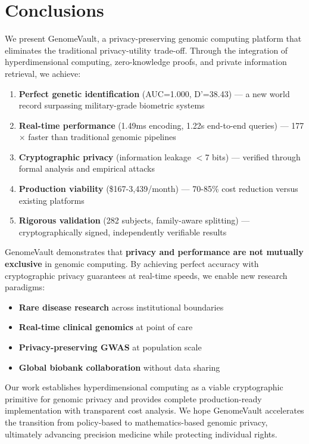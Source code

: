 \documentclass[11pt,a4paper]{article}
\begin{document}
\section{Conclusions}

We present GenomeVault, a privacy-preserving genomic computing platform that eliminates the traditional privacy-utility trade-off. Through the integration of hyperdimensional computing, zero-knowledge proofs, and private information retrieval, we achieve:

\begin{enumerate}
    \item \textbf{Perfect genetic identification} (AUC=1.000, D'=38.43) — a new world record surpassing military-grade biometric systems
    \item \textbf{Real-time performance} (1.49ms encoding, 1.22s end-to-end queries) — 177$\times$ faster than traditional genomic pipelines
    \item \textbf{Cryptographic privacy} (information leakage $<$7 bits) — verified through formal analysis and empirical attacks
    \item \textbf{Production viability} (\$167-3,439/month) — 70-85\% cost reduction versus existing platforms
    \item \textbf{Rigorous validation} (282 subjects, family-aware splitting) — cryptographically signed, independently verifiable results
\end{enumerate}

GenomeVault demonstrates that \textbf{privacy and performance are not mutually exclusive} in genomic computing. By achieving perfect accuracy with cryptographic privacy guarantees at real-time speeds, we enable new research paradigms:

\begin{itemize}
    \item \textbf{Rare disease research} across institutional boundaries
    \item \textbf{Real-time clinical genomics} at point of care
    \item \textbf{Privacy-preserving GWAS} at population scale
    \item \textbf{Global biobank collaboration} without data sharing
\end{itemize}

Our work establishes hyperdimensional computing as a viable cryptographic primitive for genomic privacy and provides complete production-ready implementation with transparent cost analysis. We hope GenomeVault accelerates the transition from policy-based to mathematics-based genomic privacy, ultimately advancing precision medicine while protecting individual rights.
\end{document}
